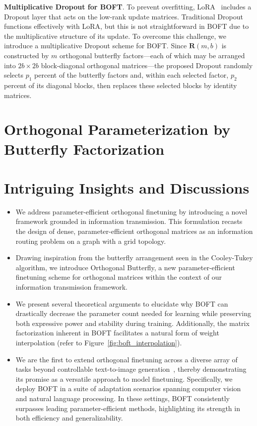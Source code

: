 \textbf{Multiplicative Dropout for BOFT}. To prevent overfitting, LoRA~\cite{hulora2022} includes a Dropout layer that acts on the low-rank update matrices. Traditional Dropout~\cite{srivastava2014dropout} functions effectively with LoRA, but this is not straightforward in BOFT due to the multiplicative structure of its update. To overcome this challenge, we introduce a multiplicative Dropout scheme for BOFT. Since $\bm{R}(m,b)$ is constructed by $m$ orthogonal butterfly factors—each of which may be arranged into $2b \times 2b$ block-diagonal orthogonal matrices—the proposed Dropout randomly selects $p_1$ percent of the butterfly factors and, within each selected factor, $p_2$ percent of its diagonal blocks, then replaces these selected blocks by identity matrices. 

\section{Orthogonal Parameterization by Butterfly Factorization}

\section{Intriguing Insights and Discussions}

\begin{itemize}[leftmargin=*,nosep]
    \item We address parameter-efficient orthogonal finetuning by introducing a novel framework grounded in information transmission. This formulation recasts the design of dense, parameter-efficient orthogonal matrices as an information routing problem on a graph with a grid topology.
    \item Drawing inspiration from the butterfly arrangement seen in the Cooley-Tukey algorithm, we introduce Orthogonal Butterfly, a new parameter-efficient finetuning scheme for orthogonal matrices within the context of our information transmission framework.
    \item We present several theoretical arguments to elucidate why BOFT can drastically decrease the parameter count needed for learning while preserving both expressive power and stability during training. Additionally, the matrix factorization inherent in BOFT facilitates a natural form of weight interpolation (refer to Figure~\ref{fig:boft_interpolation}).
    \item We are the first to extend orthogonal finetuning across a diverse array of tasks beyond controllable text-to-image generation~\cite{qiu2023controlling}, thereby demonstrating its promise as a versatile approach to model finetuning. Specifically, we deploy BOFT in a suite of adaptation scenarios spanning computer vision and natural language processing. In these settings, BOFT consistently surpasses leading parameter-efficient methods, highlighting its strength in both efficiency and generalizability.
\end{itemize}

